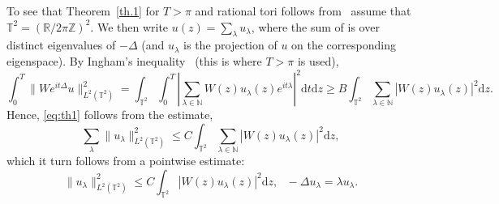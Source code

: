 \documentclass[AHL, Unicode, longabstracts]{cedram}
\newcommand{\NN}{{\mathbb N}}
\newcommand{\R}{{\mathbb R}}
\newcommand{\TT}{{\mathbb T}}
\newcommand{\ZZ}{{\mathbb Z}}
\newcommand{\TT}{{\mathbb T}}
\newcommand{\R}{{\mathbb R}}
\newcommand{\ZZ}{{\mathbb Z}}
\newcommand*{\dd}{\mathrm{d}}
\newcommand*{\dz}{\dd z}
\newcommand*{\dt}{\dd t}
\begin{document}
To see that Theorem~\ref{th.1} for $ T > \pi $ and rational tori follows from~\cite[Theorem~1.2]{Jak} assume that $ \TT^2 = (\R/2\pi \ZZ)^2 $. We then write $ u (z) = \sum_{ \lambda } u_\lambda $, where the sum of is over distinct eigenvalues of $ - \Delta $ (and $u_\lambda$ is the projection of $u$ on the corresponding eigenspace). By Ingham's inequality~\cite{ing} (this is where $ T > \pi $ is used),
\[
\int_0^T \| W e^{ it \Delta} u \|^2_{ L^2 (\TT^2)} =
\int_{\TT^2 } \int_0^T \left| \sum_{ \lambda \in \NN } W(z) u_\lambda (z) e^{i t \lambda } \right|^2 \dt \dz \geq B
\int_{\TT^2} \sum_{ \lambda \in \NN } | W (z) u_\lambda (z) |^2 \dz.
\]
Hence, \eqref{eq:th1} follows from the estimate,
\begin{equation}\label{eq:Jak}
\sum_{ \lambda } \| u_\lambda\|^2_{L^2 (\TT^2) } \leq C \int_{\TT^2} \sum_{ \lambda \in \NN } | W (z) u_\lambda (z) |^2 \dz,
\end{equation}
which it turn follows from a pointwise estimate:
\begin{equation}\label{eq:Jak1}
\| u_\lambda\|^2_{L^2 (\TT^2) } \leq C \int_{\TT^2} | W (z) u_\lambda (z) |^2 \dz, \ \ \ - \Delta u_\lambda = \lambda u_\lambda.
\end{equation}
\end{document}
